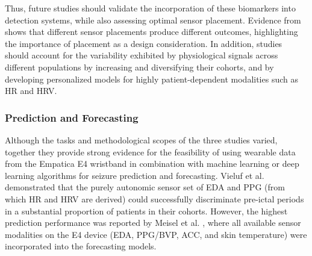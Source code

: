 Thus, future studies should validate the incorporation of these biomarkers into detection systems, while also assessing optimal sensor placement. Evidence from \cite{Milosevic2016-ee, De_Cooman2018-pq} shows that different sensor placements produce different outcomes, highlighting the importance of placement as a design consideration. In addition, studies should account for the variability exhibited by physiological signals across different populations by increasing and diversifying their cohorts, and by developing personalized models for highly patient-dependent modalities such as HR and HRV.

\subsubsection{Prediction and Forecasting}
Although the tasks and methodological scopes of the three studies varied, together they provide strong evidence for the feasibility of using wearable data from the Empatica E4 wristband in combination with machine learning or deep learning algorithms for seizure prediction and forecasting. Vieluf et al. \cite{Vieluf2023-ta, Vieluf2023-zv} demonstrated that the purely autonomic sensor set of EDA and PPG (from which HR and HRV are derived) could successfully discriminate pre-ictal periods in a substantial proportion of patients in their cohorts. However, the highest prediction performance was reported by Meisel et al. \cite{Meisel2020-ii}, where all available sensor modalities on the E4 device (EDA, PPG/BVP, ACC, and skin temperature) were incorporated into the forecasting models.